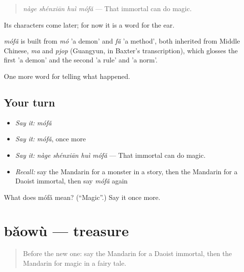 \begin{quote}
\emph{nàge shénxiān huì mófǎ} — That immortal can do magic.
\end{quote}

Its characters come later; for now it is a word for the ear.

\begin{cousinweb}
\emph{mófǎ} is built from \emph{mó} 'a demon' and \emph{fǎ} 'a method', both inherited from Middle Chinese, \emph{ma} and \emph{pjop} (Guangyun, in Baxter's transcription), which glosses the first 'a demon' and the second 'a rule' and 'a norm'.
\end{cousinweb}

\begin{grammarlens}[title={What you've built}]
One more word for telling what happened.
\end{grammarlens}

\subsection*{Your turn}
\begin{itemize}
\raggedright
  \item \emph{Say it:} \emph{mófǎ}
  \item \emph{Say it:} \emph{mófǎ}, once more
  \item \emph{Say it:} \emph{nàge shénxiān huì mófǎ} — That immortal can do magic.
  \item \emph{Recall:} say the Mandarin for a monster in a story, then the Mandarin for a Daoist immortal, then say \emph{mófǎ} again
\end{itemize}

\begin{tcolorbox}[breakable,colback=teal!4,colframe=teal!35!black,title={Before you move on}]
What does mófǎ mean? (\textquotedblleft{}Magic\textquotedblright{}.) Say it once more.
\end{tcolorbox}
\section[bǎowù]{bǎowù — treasure}

\label{lesson:ZH-C331-baowu}



\begin{quote}
Before the new one: say the Mandarin for a Daoist immortal, then the Mandarin for magic in a fairy tale.
\end{quote}

